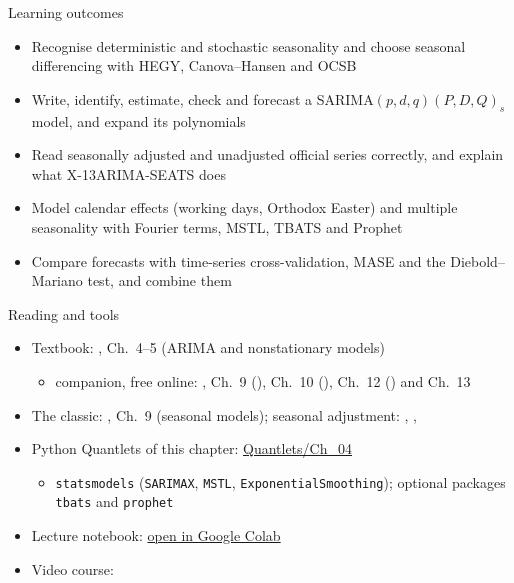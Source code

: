 \begin{frame}{Learning outcomes}
\itemsize{\small}
\begin{itemize}
    \item Recognise deterministic and stochastic seasonality and choose seasonal differencing with HEGY, Canova--Hansen and OCSB
    \item Write, identify, estimate, check and forecast a SARIMA$(p,d,q)(P,D,Q)_s$ model, and expand its polynomials
    \item Read seasonally adjusted and unadjusted official series correctly, and explain what X-13ARIMA-SEATS does
    \item Model calendar effects (working days, Orthodox Easter) and multiple seasonality with Fourier terms, MSTL, TBATS and Prophet
    \item Compare forecasts with time-series cross-validation, MASE and the Diebold--Mariano test, and combine them
\end{itemize}
\end{frame}

\begin{frame}{Reading and tools}
\itemsize{\small}
\begin{itemize}
    \item Textbook: , Ch.~4--5 (ARIMA and nonstationary models)
    \begin{itemize}
        \item companion, free online: , Ch.~9 (), Ch.~10 (), Ch.~12 () and Ch.~13
    \end{itemize}
    \item The classic: , Ch.~9 (seasonal models); seasonal adjustment: , , 
    \item Python Quantlets of this chapter: \href{https://github.com/danpele/Time-Series-Analysis/tree/main/Quantlets/Ch_04}{Quantlets/Ch\_04}
    \begin{itemize}
        \item \texttt{statsmodels} (\texttt{SARIMAX}, \texttt{MSTL}, \texttt{ExponentialSmoothing}); optional packages \texttt{tbats} and \texttt{prophet}
    \end{itemize}
    \item Lecture notebook: \href{\colaburl{notebooks/EN/chapter4_lecture_notebook.ipynb}}{open in Google Colab}
    \item Video course: 
\end{itemize}
\end{frame}



